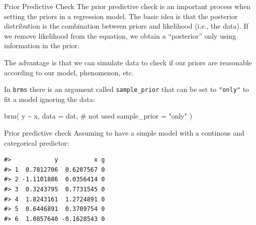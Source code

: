 \documentclass[
  ignorenonframetext,
]{beamer}
\newenvironment{Shaded}{\begin{snugshade}}{\end{snugshade}}
\newcommand{\AttributeTok}[1]{\textcolor[rgb]{0.40,0.45,0.13}{#1}}
\newcommand{\CommentTok}[1]{\textcolor[rgb]{0.37,0.37,0.37}{#1}}
\newcommand{\FunctionTok}[1]{\textcolor[rgb]{0.28,0.35,0.67}{#1}}
\newcommand{\NormalTok}[1]{\textcolor[rgb]{0.00,0.23,0.31}{#1}}
\newcommand{\SpecialCharTok}[1]{\textcolor[rgb]{0.37,0.37,0.37}{#1}}
\newcommand{\StringTok}[1]{\textcolor[rgb]{0.13,0.47,0.30}{#1}}
\begin{document}
\begin{frame}[fragile]{Prior Predictive Check}
\label{prior-predictive-check}
The prior predictive check is an important process when setting the
priors in a regression model. The basic idea is that the posterior
distribution is the combination between priors and likelihood (i.e., the
data). If we remove likelihood from the equation, we obtain a
``posterior'' only using information in the prior.

The advantage is that we can simulate data to check if our priors are
reasonable according to our model, phenomenon, etc.

In \texttt{brms} there is an argument called \texttt{sample\_prior} that
can be set to \texttt{"only"} to fit a model ignoring the data:

\begin{Shaded}
\begin{Highlighting}[]
\FunctionTok{brm}\NormalTok{(}
\NormalTok{  y }\SpecialCharTok{\textasciitilde{}}\NormalTok{ x,}
  \AttributeTok{data =}\NormalTok{ dat, }\CommentTok{\# not used}
  \AttributeTok{sample\_prior =} \StringTok{"only"}
\NormalTok{)}
\end{Highlighting}
\end{Shaded}
\end{frame}

\begin{frame}[fragile]{Prior predictive check}
\label{prior-predictive-check-1}
Assuming to have a simple model with a continous and categorical
predictor:

\begin{verbatim}
#>            y          x g
#> 1  0.7812706  0.6207567 0
#> 2 -1.1101886  0.0356414 0
#> 3  0.3243795  0.7731545 0
#> 4  1.8243161  1.2724891 0
#> 5  0.6446891  0.3709754 0
#> 6  1.0857640 -0.1628543 0
\end{verbatim}
\end{frame}
\end{document}
